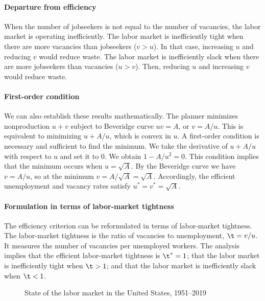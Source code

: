 \documentclass[letterpaper,12pt,leqno]{article}
\newcommand{\pdf}{figures.pdf}
\begin{document}
\paragraph{Departure from efficiency} When the number of jobseekers is not equal to the number of vacancies, the labor market is operating inefficiently. The labor market is inefficiently tight when there are more vacancies than jobseekers ($v > u$). In that case, increasing $u$ and reducing $v$ would reduce waste. The labor market is inefficiently slack when there are more jobseekers than vacancies ($u > v$). Then, reducing $u$ and increasing $v$ would reduce waste.

\paragraph{First-order condition} We can also establish these results mathematically. The planner minimizes nonproduction $u + v$ subject to Beveridge curve $uv = A$, or $v = A/u$. This is equivalent to minimizing $u+A/u$, which is convex in $u$. A first-order condition is necessary and sufficient to find the minimum. We take the derivative of $u+A/u$ with respect to $u$ and set it to $0$. We obtain $1-A/u^2 = 0$. This condition implies that the minimum occurs when $u = \sqrt{A}$. By the Beveridge curve we have $v = A/u$, so at the minimum $v = A/ \sqrt{A} = \sqrt{A}$. Accordingly, the efficient unemployment and vacancy rates satisfy $u^* = v^* = \sqrt{A}$.

\paragraph{Formulation in terms of labor-market tightness} The efficiency criterion can be reformulated in terms of labor-market tightness. The labor-market tightness is the ratio of vacancies to unemployment, $\t = v/u$. It measures the number of vacancies per unemployed workers. The analysis implies that the efficient labor-market tightness is $\t^* = 1$; that the labor market is inefficiently tight when $\t > 1$; and that the labor market is inefficiently slack when $\t < 1$. 

\begin{figure}[t]
\hfill
{}
\caption{State of the labor market in the United States, 1951--2019}
\label{f:state1951}\end{figure}
\end{document}
